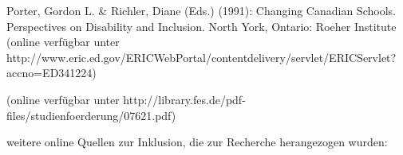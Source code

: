 Porter, Gordon L. \& Richler, Diane (Eds.) (1991): Changing Canadian Schools. Perspectives on Disability and Inclusion. North York, Ontario: Roeher Institute
(online verfügbar unter http://www.eric.ed.gov/ERICWebPortal/contentdelivery/servlet/ERICServlet?accno=ED341224)


(online verfügbar unter http://library.fes.de/pdf-files/studienfoerderung/07621.pdf)



weitere online Quellen zur Inklusion, die zur Recherche herangezogen wurden:








